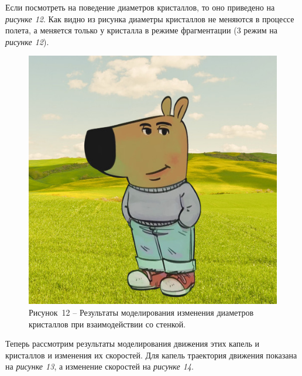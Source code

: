 Если посмотреть на поведение диаметров кристаллов, то оно приведено на \textit{рисунке 12}. Как видно из рисунка диаметры кристаллов не меняются в процессе полета, а меняется только у кристалла в режиме фрагментации (3 режим на \textit{рисунке 12}).

\begin{figure}[H]
	\centering
	\includegraphics[width=\textwidth]{figures/chill-guy.jpeg}
	\caption*{Рисунок~12 – Результаты моделирования изменения диаметров кристаллов при взаимодействии со стенкой.}
	\label{fig:-10}
\end{figure}

Теперь рассмотрим результаты моделирования движения этих капель и кристаллов и изменения их скоростей. Для капель траектория движения показана на \textit{рисунке 13}, а изменение скоростей на \textit{рисунке 14}.

